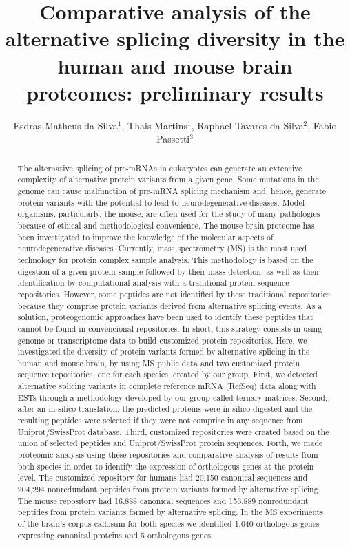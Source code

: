 \documentclass[twoside]{article}
\title{\vspace{-15mm}\fontsize{24pt}{10pt}\selectfont\textbf{Comparative analysis of the alternative splicing diversity in the human and mouse brain proteomes: preliminary results}} %
\author{Esdras Matheus da Silva$^1$, Thais Martins$^1$, Raphael Tavares da Silva$^2$, Fabio Passetti$^3$}
\affil{1 OSWALDO CRUZ INSTITUTE\\ 2 UFMG\\ 3 FIOCRUZ - IOC\\ }
\date{}
\begin{document}
\maketitle %

\thispagestyle{fancy} %


\begin{abstract}
The alternative splicing of  pre-mRNAs in eukaryotes can generate an extensive complexity of alternative protein variants from a given gene. Some mutations in the genome can cause malfunction of  pre-mRNA splicing mechanism and, hence, generate protein variants with the potential to lead to neurodegenerative diseases. Model organisms, particularly, the mouse, are often used for the study of many pathologies because of ethical and methodological convenience. The mouse brain proteome has been investigated to improve the knowledge of the molecular aspects of neurodegenerative diseases. Currently, mass spectrometry (MS) is the most used technology for protein complex sample analysis. This methodology is based on the digestion of a given protein sample followed by their mass detection, as well as their identification by computational analysis with a traditional protein sequence repositories. However, some peptides are not identified by these traditional repositories because they comprise protein variants derived from alternative splicing events. As a solution, proteogenomic approaches have been used to identify these peptides that cannot be found in convencional repositories. In short, this strategy consists in using genome or transcriptome data to build customized protein repositories. Here, we investigated the diversity of protein variants formed by alternative splicing in the human and mouse brain, by using MS public data and two customized protein sequence repositories, one for each species, created by our group. First, we detected alternative splicing variants in complete reference mRNA (RefSeq) data along with ESTs through a methodology developed by our group called ternary matrices. Second, after an in silico translation, the predicted proteins were in silico digested and the resulting peptides were selected if they were not comprise in any sequence from Uniprot/SwissProt database. Third, customized repositories were created based on the union of selected peptides and Uniprot/SwissProt protein sequences. Forth, we made proteomic analysis using these repositories and comparative analysis of results from both species in order to identify the expression of orthologous genes at the protein level. The customized repository for humans had 20,150 canonical sequences and 204,294 nonredundant peptides from protein variants formed by alternative splicing. The mouse repository had 16,888 canonical sequences and 156,889 nonredundant peptides from protein variants formed by alternative splicing. In the MS experiments of the brain's corpus callosum for both species we identified 1,040 orthologous genes expressing canonical proteins and 5 orthologous genes 
\end{abstract}
\end{document}
